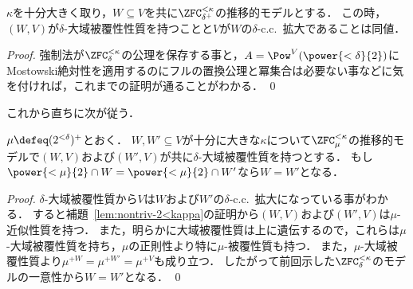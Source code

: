 \documentclass[a4j,leqno]{ltjsarticle}
\newcommand{\cc}{c.c.\ }
\begin{document}
\begin{corollary}
 $\kappa$を十分大きく取り，$W \subseteq V$を共に$\ZFC^{<\kappa}_{\delta^+}$の推移的モデルとする．
 この時，$(W, V)$が$\delta$-大域被覆性性質を持つことと$V$が$W$の$\delta$-\cc{}拡大であることは同値．
\end{corollary}
\begin{proof}
 強制法が$\ZFC^{<\kappa}_\delta$の公理を保存する事と，$A = \Pow^V(\power{<\delta}{2})$にMostowski絶対性を適用するのにフルの置換公理と冪集合は必要ない事などに気を付ければ，これまでの証明が通ることがわかる． \qed
\end{proof}
これから直ちに次が従う．
\begin{lemma}\label{lem:global-covering-unique}
 $\mu \defeq (2^{<\delta})^+$とおく．
 $W, W' \subseteq V$が十分に大きな$\kappa$について$\ZFC^{< \kappa}_{\mu}$の推移的モデルで$(W, V)$および$(W', V)$が共に$\delta$-大域被覆性質を持つとする．
 もし$\power{<\mu}{2} \cap W = \power{<\mu}{2} \cap W'$なら$W = W'$となる．
\end{lemma}
\begin{proof}
 $\delta$-大域被覆性質から$V$は$W$および$W'$の$\delta$-\cc{}拡大になっている事がわかる．
 すると補題~\ref{lem:nontriv-2<kappa}の証明から$(W, V)$および$(W', V)$は$\mu$-近似性質を持つ．
 また，明らかに大域被覆性質は上に遺伝するので，これらは$\mu$-大域被覆性質を持ち，$\mu$の正則性より特に$\mu$-被覆性質も持つ．
 また，$\mu$-大域被覆性質より$\mu^{+W} = \mu^{+W'} = \mu^{+V}$も成り立つ．
 したがって前回示した$\ZFC^{<\kappa}_\delta$のモデルの一意性から$W = W'$となる． \qed
\end{proof}


\nocite{Fuchs:2014fj,Usuba:2017fp}
\nocite{Friedman:2016lr}
\printbibliography[title=参考文献]
\end{document}
